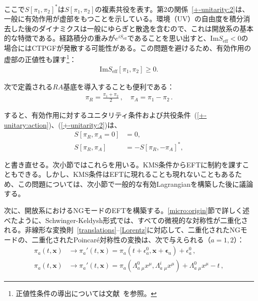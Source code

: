 ここで$S[\pi_1,\pi_2]^*$は$S[\pi_1,\pi_2]$の複素共役を表す。第2の関係~\eqref{+-unitarity:2}は、一般に有効作用が虚部をもつことを示している。環境（UV）の自由度を積分消去した後のダイナミクスは一般にゆらぎと散逸を含むので、これは開放系の基本的な特徴である。経路積分の重みが$e^{iS_{\mathrm{eff}}}$であることを思い出すと、$\mathrm{Im} S_{\mathrm{eff}} < 0$の場合にはCTPGFが発散する可能性がある。この問題を避けるため、有効作用の虚部の正値性も課す\footnote{正値性条件の導出については文献~\cite{Glorioso:2016gsa}を参照。}：
\begin{align}
 \mathrm{Im} S_{\mathrm{eff}} [\pi_1,\pi_2] \geq 0.\label{unitary:open}
\end{align}

次で定義される$RA$基底を導入することも便利である：
\begin{align}
 \pi_R = \frac{\pi_1 + \pi_2}{2}\,,
 \quad
 \pi_A=\pi_1-\pi_2\,.
\label{def:RAbasis}
\end{align}

すると、有効作用に対するユニタリティ条件および共役条件~(\ref{+-unitary:action})、(\ref{+-unitarity:2})は、
\begin{align}
S[\pi_{R},\pi_{A}=0]&=0,\label{unitary:action}
\\
S[\pi_{R},\pi_{A}]&=-S [\pi_{R},-\pi_{A}]^*,
\label{unitarity:2}
\end{align}

と書き直せる。次小節ではこれらを用いる。KMS条件からEFTに制約を課すこともできる。しかし、KMS条件はEFTに現れることも現れないこともあるため、この問題については、次小節で一般的な有効Lagrangianを構築した後に議論する。

\label{subsec:EFT_const}

次に、開放系におけるNGモードのEFTを構築する。\ref{micro:origin}節で詳しく述べたように、Schwinger-Keldysh形式では、すべての微視的な対称性が二重化される。非線形な変換則~\eqref{translations}--\eqref{Lorentz}に対応して、二重化されたNGモードの、二重化されたPoincar\'e対称性の変換は、次で与えられる（$a=1,2$）：
\begin{align}
\label{pi_a_translations}
 \pi_a(t,\mathbf{x})
 &\to \pi_a'(t,\mathbf{x})
 = \pi_a\left(t+\epsilon^0_a,\mathbf{x}+\boldsymbol{\epsilon}_a\right)+\epsilon^0_a\,,
\\
\pi_a(t,\mathbf{x})
 &\to \pi_a' (t,\mathbf{x}) 
 = \pi_a \left(\Lambda_a^0\,{}_\mu x^\mu,\Lambda_a^i\,{}_\mu x^\mu\right)+\Lambda_a^0\,{}_\mu x^\mu-t
\,,
\end{align}

